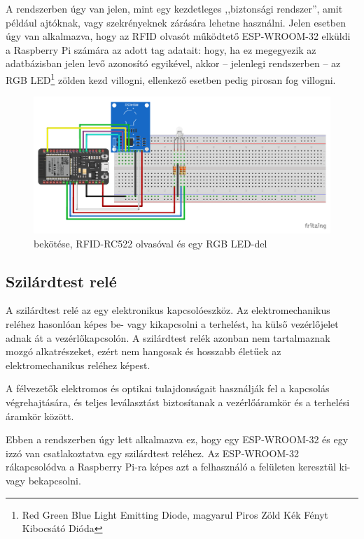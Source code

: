 \documentclass[
]{thesis-ekf}
\theoremstyle{definition}
\theoremstyle{remark}
\begin{document}
	A rendszerben úgy van jelen, mint egy kezdetleges ,,biztonsági rendszer'', amit például ajtóknak, vagy szekrényeknek zárására lehetne használni. Jelen esetben úgy van alkalmazva, hogy az RFID olvasót működtető ESP-WROOM-32 elküldi a Raspberry Pi számára az adott tag adatait: hogy, ha ez megegyezik az adatbázisban jelen levő azonosító egyikével, akkor -- jelenlegi rendszerben -- az RGB LED\footnote{\label{rgb-led}Red Green Blue Light Emitting Diode, magyarul Piros Zöld Kék Fényt Kibocsátó Dióda} zölden kezd villogni, ellenkező esetben pedig pirosan fog villogni.
	
	\begin{figure}[ht!]
		\centering
		\includegraphics[width=16cm]{./img/RFID reader schematics_bb}
		\caption{ bekötése, RFID-RC522 olvasóval és egy RGB LED-del}
		\label{rfid-schematics}
	\end{figure}	
	
	\subsection{Szilárdtest relé}
	
	A szilárdtest relé az egy elektronikus kapcsolóeszköz. Az elektromechanikus reléhez hasonlóan képes be- vagy kikapcsolni a terhelést, ha külső vezérlőjelet adnak át a vezérlőkapcsolón. A szilárdtest relék azonban nem tartalmaznak mozgó alkatrészeket, ezért nem hangosak és hosszabb életűek az elektromechanikus reléhez képest. 
	
	A félvezetők elektromos és optikai tulajdonságait használják fel a kapcsolás végrehajtására, és teljes leválasztást biztosítanak a vezérlőáramkör és a terhelési áramkör között.\cite{solid-state-relay}
	
	Ebben a rendszerben úgy lett alkalmazva ez, hogy egy ESP-WROOM-32 és egy izzó van csatlakoztatva egy szilárdtest reléhez. Az ESP-WROOM-32 rákapcsolódva a Raspberry Pi-ra képes azt a felhasználó a felületen keresztül ki- vagy bekapcsolni.
	
\end{document}
